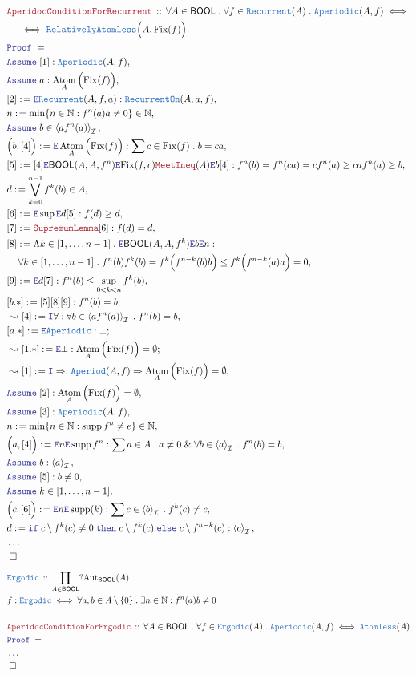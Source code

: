 \documentclass[12pt]{scrartcl}
\newcommand{\TYPE}[1]{\textcolor{NavyBlue}{\mathtt{#1}}}
\newcommand{\LOGIC}[1]{\textcolor{Blue}{\mathtt{#1}}}
\newcommand{\THM}[1]{\textcolor{Maroon}{\mathtt{#1}}}
\renewcommand{\.}{\; . \;}
\newcommand{\de}{: \kern 0.1pc =}
\newcommand{\If}{\LOGIC{if} \;}
\newcommand{\Then}{ \; \LOGIC{then} \;}
\newcommand{\Else}{\; \LOGIC{else} \;}
\newcommand{\Theorem}[2]{& \THM{#1} \, :: \, #2 \\ & \Proof = \\ }
\newcommand{\DeclareType}[2]{& \TYPE{#1} \, :: \, #2 \\}
\newcommand{\DefineType}[3]{& #1 : \TYPE{#2} \iff #3 \\}
\newcommand{\NewLine}{\\ & \kern 1pc}
\newcommand{\Page}[1]{ \begin{align*} #1 \end{align*}   }
\newcommand{\NoProof}{ & \ldots \\ \EndProof}
\renewcommand{\And}{\; \& \;}
\newcommand{\Imply}{\Rightarrow}
\newcommand{\Intro}{\LOGIC{I}}
\newcommand{\Elim}{\LOGIC{E}}
\newcommand{\Nat}{\mathbb{N} }
\DeclareMathOperator*{\supp}{supp}
\newcommand{\Aut}{\mathrm{Aut}}
\newcommand{\Say}[3]{& #1 \de #2 : #3, \\}
\newcommand{\SayIn}[3]{& #1 \de #2 \in #3, \\}
\newcommand{\Conclude}[3]{& #1 \de #2 : #3; \\}
\newcommand{\Derive}[3]{& \leadsto #1 \de #2 : #3, \\}
\newcommand{\DeriveConclude}[3]{& \leadsto #1 \de #2 : #3 ; \\}
\newcommand{\Assume}[2]{& \LOGIC{Assume} \; #1 : #2, \\}
\newcommand{\AssumeIn}[2]{& \LOGIC{Assume} \; #1 \in #2, \\}
\newcommand{\QED}{\; \square}
\newcommand{\EndProof}{& \QED \\}
\newcommand{\Proof}{\LOGIC{Proof} \; }
\newcommand{\genIdeal}[1]{\left\langle #1 \right\rangle_\mathcal{I}}
\newcommand{\Fix}{\mathrm{Fix}}
\newcommand{\Aless}{\TYPE{Atomless}}
\DeclareMathOperator{\Atom}{Atom}
\newcommand{\BOOL}{\mathsf{BOOL}}
\begin{document}
\Page{
	\Theorem{AperidocConditionForRecurrent}
	{
		\forall A \in \BOOL \. 
		\forall f \in  \TYPE{Recurrent}(A) \.
		\TYPE{Aperiodic}(A,f) 
		\iff
		\NewLine
		\iff
		\TYPE{RelativelyAtomless}\Big( A, \Fix(f) \Big)
	}
	\Assume{[1]}{\TYPE{Aperiodic}(A,f)}
	\Assume{a}{\Atom_A\Big(\Fix(f)\Big)}
	\Say{[2]}{\Elim \TYPE{Recurrent}(A,f,a)}{\TYPE{RecurrentOn}(A,a,f)}
	\SayIn{n}{\min \{n\in \Nat : f^n(a)a \neq 0 \}}{\Nat}
	\AssumeIn{b}{\genIdeal{af^n(a)}}
	\Say{\Big( b, [4]\Big)}{\Elim \Atom_A\Big(\Fix(f)\Big)}
	{
		\sum c \in \Fix(f) \.
		b = ca
	}
	\Say{[5]}{[4]\Elim \BOOL(A,A,f^n) \Elim \Fix(f,c) \THM{MeetIneq}(A)\Elim b [4]}
	{
		f^n(b) = 
		f^n(ca) = 
		cf^n(a) \ge 
		caf^n(a) \ge b
	}
	\SayIn{d}{\bigvee^{n-1}_{k=0} f^k(b)}{A}
	\Say{[6]}{\Elim \sup \Elim d [5]}{ f(d) \ge d  }
	\Say{[7]}{\THM{SupremumLemma}[6]}{f(d) = d}
	\Say{[8]}{\Lambda k \in [1,\ldots,n-1] \. \Elim \BOOL(A,A,f^k)\Elim b \Elim n }
	{
		\NewLine 
		\forall k \in [1,\ldots,n-1] \.		
		f^n(b) f^k(b)  =
		f^k\Big( f^{n-k}(b) b \Big)  \le
		f^k\Big( f^{n-k}(a) a \Big) = 0
	}
	\Say{[9]}{\Elim d [7]}{f^n(b) \le \sup_{0 < k < n} f^k(b)}	
	\Conclude{[b.*]}{[5][8][9]}{f^n(b) = b}
	\Derive{[4]}{\Intro \forall}{\forall b \in \genIdeal{af^{n}(a)} \. f^n(b) = b}
	\Conclude{[a.*]}{\Elim \TYPE{Aperiodic} }{\bot}
	\DeriveConclude{[1.*]}{\Elim \bot}{ \Atom_A\Big( \Fix(f) \Big) = \emptyset}
	\Derive{[1]}{\Intro \Imply}
	{
		\TYPE{Aperiod}(A,f) 
		\Imply
		\Atom_A\Big( \Fix(f) \Big) = \emptyset
	}
	\Assume{[2]}{  \Atom_A\Big( \Fix(f) \Big) = \emptyset  }
	\Assume{[3]}{\TYPE{Aperiodic}(A,f)}
	\SayIn{n}{\min \{ n \in \Nat : \supp f^n \neq e \}}{\Nat}
	\Say{\Big( a, [4]  \Big)}{\Elim n \Elim \supp f^n}
	{
		\sum a \in A \. a \neq 0 \And \forall b \in \genIdeal{a} \. f^n(b) = b	
	}
	\Assume{b}{\genIdeal{a}}
	\Assume{[5]}{b \neq 0}
	\AssumeIn{k}{[1,\ldots,n-1]}
	\Say{\Big(c,[6]\Big)}{\Elim n \Elim \supp (k)}
	{
		\sum c \in \genIdeal{b} \.
		f^k(c) \neq c
	}
	\Say{d}{
		\If  
		c \setminus  f^k(c) \neq 0
		\Then
		c \setminus  f^k(c)	 
		\Else	
		c \setminus f^{n-k}(c)
	}
	{
		\genIdeal{c}
	}
	\NoProof	
}\Page{
	\DeclareType{Ergodic}{\prod_{A \in \BOOL} ?\Aut_\BOOL(A)}
	\DefineType{f}{Ergodic}{\forall a,b \in A \setminus \{0\}  \. 
		\exists n \in \Nat : f^n(a)b \neq 0	
	}
	\\
	\Theorem{AperidocConditionForErgodic}
	{
		\forall A \in \BOOL \. 
		\forall f \in  \TYPE{Ergodic}(A) \.
		\TYPE{Aperiodic}(A,f) 
		\iff
		\Aless(A)
	}
	\NoProof
	\\	
}
\newpage
\end{document}
